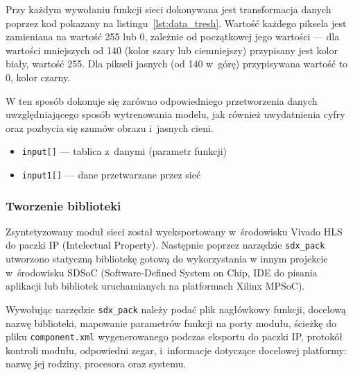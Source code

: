 \documentclass[12pt, oneside, a4paper]{article}
\begin{document}
Przy każdym wywołaniu funkcji sieci dokonywana jest transformacja
danych poprzez kod pokazany na listingu~\ref{lst:data_tresh}.
Wartość każdego piksela jest zamieniana na wartość 255 lub 0, zależnie
od początkowej jego wartości --- dla wartości mniejszych od 140
(kolor szary lub ciemniejszy) przypisany jest kolor biały, wartość 255.
Dla pikseli jasnych (od 140 w~górę) przypisywana wartość to 0, kolor czarny.

W ten sposób dokonuje się zarówno odpowiedniego przetworzenia danych
uwzględniającego sposób wytrenowania modelu, jak również uwydatnienia
cyfry oraz pozbycia się szumów obrazu i~jasnych cieni.

\hspace{-1cm}
\begin{minipage}{\linewidth}

\begin{itemize}
  \setlength{\itemindent}{3em}
  \item \lstinline[style=hls]{input[]} --- tablica z~danymi (parametr funkcji)
  \item \lstinline[style=hls]{input1[]} --- dane przetwarzane przez sieć
\end{itemize}
\end{minipage}

\subsubsection{Tworzenie biblioteki}\label{section:create_library}

Zsyntetyzowany moduł sieci został wyeksportowany w~środowisku Vivado HLS
do paczki IP (Intelectual Property). Następnie poprzez narzędzie
\lstinline{sdx_pack} utworzono statyczną bibliotekę gotową do wykorzystania
w innym projekcie w~środowisku SDSoC (Software-Defined System on Chip,
IDE do pisania aplikacji lub bibliotek uruchamianych na platformach
Xilinx MPSoC).

Wywołując narzędzie \lstinline{sdx_pack} należy podać plik nagłówkowy funkcji,
docelową nazwę biblioteki, mapowanie parametrów funkcji na porty modułu,
ścieżkę do pliku \lstinline{component.xml} wygenerowanego podczas eksportu
do paczki IP, protokół kontroli modułu, odpowiedni zegar, i~informacje
dotyczące docelowej platformy: nazwę jej rodziny, procesora oraz systemu.

\hspace{1mm}
\begin{minipage}{0.95\linewidth}

\end{minipage}
\end{document}
